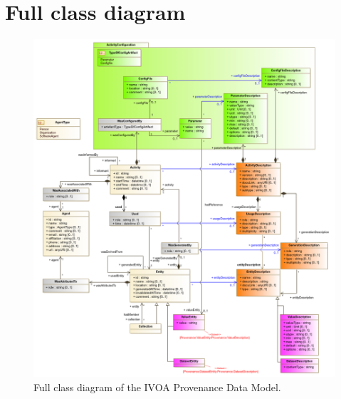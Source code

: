\documentclass[11pt,a4paper]{ivoa}
\begin{document}
%


\clearpage
\section{Full class diagram}
\label{sec:fulldiagram}

\begin{figure}[ht]
\centering
\hspace*{-.13\textwidth} 
\includegraphics[width=1.2\textwidth]{PROV_Fig8.png}
\caption[Full class diagram of the IVOA Provenance Data Model]{Full class diagram of the IVOA Provenance Data Model.}
\label{fig:fulldiagram}
\end{figure}
\end{document}
